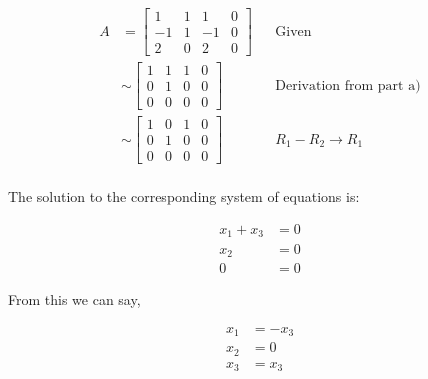 \documentclass[10pt,letterpaper,final]{report}
\newcommand{\reason}[1]{&& \text{#1}}
\begin{document}
\begin{enumerate}[label=(\alph*)]
        \begin{align*}
          A & = \left[\begin{array}{rrr|r}
                    1  & 1 & 1  & 0 \\
                    -1 & 1 & -1 & 0 \\
                    2  & 0 & 2  & 0
                  \end{array}\right] \reason{Given}                      \\[1ex]
            & \sim \left[\begin{array}{rrr|r}
                       1 & 1 & 1 & 0 \\
                       0 & 1 & 0 & 0 \\
                       0 & 0 & 0 & 0
                     \end{array}\right] \reason{Derivation from part a)} \\[1ex]
            & \sim \left[\begin{array}{rrr|r}
                       1 & 0 & 1 & 0 \\
                       0 & 1 & 0 & 0 \\
                       0 & 0 & 0 & 0
                     \end{array}\right] \reason{$R_1 - R_2 \to R_1$}     \\[1ex]
        \end{align*}

        The solution to the corresponding system of equations is:

        \begin{align*}
          {x}_1 + {x}_3 & = 0 \\
          {x}_2                & = 0 \\
          0                           & = 0
        \end{align*}

        From this we can say,

        \begin{align*}
          {x}_1 & = - {x}_3 \\
          {x}_2 & = 0       \\
          {x}_3 & = {x}_3
        \end{align*}


\end{enumerate}
\end{document}
